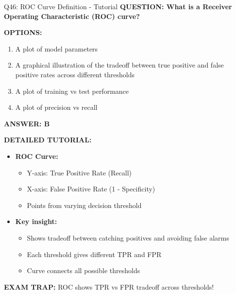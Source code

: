 \documentclass[8pt]{beamer}
\begin{document}
	\begin{frame}{Q46: ROC Curve Definition - Tutorial}
		\fontsize{6.5}{7.5}\selectfont
		\textbf{QUESTION: What is a Receiver Operating Characteristic (ROC) curve?}
		
		\vspace{0.1cm}
		\textbf{OPTIONS:}
		\begin{enumerate}
			\item A plot of model parameters
			\item A graphical illustration of the tradeoff between true positive and false positive rates across different thresholds
			\item A plot of training vs test performance
			\item A plot of precision vs recall
		\end{enumerate}
		
		\vspace{0.1cm}
		\textcolor{myblue}{\textbf{ANSWER: B}}
		
		\vspace{0.1cm}
		\textbf{DETAILED TUTORIAL:}
		\begin{itemize}
			\item \textbf{ROC Curve:}
			\begin{itemize}
				\item Y-axis: True Positive Rate (Recall)
				\item X-axis: False Positive Rate (1 - Specificity)
				\item Points from varying decision threshold
			\end{itemize}
			\item \textbf{Key insight:}
			\begin{itemize}
				\item Shows tradeoff between catching positives and avoiding false alarms
				\item Each threshold gives different TPR and FPR
				\item Curve connects all possible thresholds
			\end{itemize}
		\end{itemize}
		
		\textcolor{myred}{\textbf{EXAM TRAP:}} ROC shows \textcolor{myblue}{TPR vs FPR} tradeoff across thresholds!
	\end{frame}
	
\end{document}
